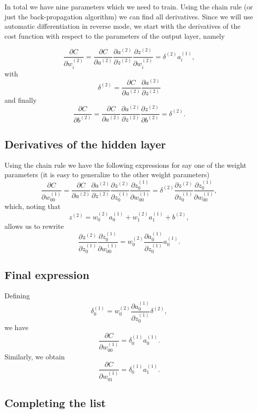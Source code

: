 \documentclass[%
oneside,                 %
final,                   %
10pt]{article}
\begin{document}
In total we have nine parameters which we need to train.  Using the
chain rule (or just the back-propagation algorithm) we can find all
derivatives. Since we will use automatic differentiation in reverse
mode, we start with the derivatives of the cost function with respect
to the parameters of the output layer, namely

\[
\frac{\partial C}{\partial w_{i}^{(2)}}=\frac{\partial C}{\partial a^{(2)}}\frac{\partial a^{(2)}}{\partial z^{(2)}}\frac{\partial z^{(2)}}{\partial w_{i}^{(2)}}=\delta^{(2)}a_i^{(1)},
\]
with
\[
\delta^{(2)}=\frac{\partial C}{\partial a^{(2)}}\frac{\partial a^{(2)}}{\partial z^{(2)}}
\]
and finally
\[
\frac{\partial C}{\partial b^{(2)}}=\frac{\partial C}{\partial a^{(2)}}\frac{\partial a^{(2)}}{\partial z^{(2)}}\frac{\partial z^{(2)}}{\partial b^{(2)}}=\delta^{(2)}.
\]

\subsection{Derivatives of the hidden layer}

Using the chain rule we have the following expressions for say one of the weight parameters (it is easy to generalize to the other weight parameters)
\[
\frac{\partial C}{\partial w_{00}^{(1)}}=\frac{\partial C}{\partial a^{(2)}}\frac{\partial a^{(2)}}{\partial z^{(2)}}
\frac{\partial z^{(2)}}{\partial z_0^{(1)}}\frac{\partial z_0^{(1)}}{\partial w_{00}^{(1)}}=    \delta^{(2)}\frac{\partial z^{(2)}}{\partial z_0^{(1)}}\frac{\partial z_0^{(1)}}{\partial w_{00}^{(1)}},
\]
which, noting that
\[
z^{(2)} =w_0^{(2)}a_0^{(1)}+w_1^{(2)}a_1^{(1)}+b^{(2)},
\]
allows us to rewrite 
\[
\frac{\partial z^{(2)}}{\partial z_0^{(1)}}\frac{\partial z_0^{(1)}}{\partial w_{00}^{(1)}}=w_0^{(2)}\frac{\partial a_0^{(1)}}{\partial z_0^{(1)}}a_0^{(1)}.
\]

\subsection{Final expression}
Defining
\[
\delta_0^{(1)}=w_0^{(2)}\frac{\partial a_0^{(1)}}{\partial z_0^{(1)}}\delta^{(2)},
\]
we have 
\[
\frac{\partial C}{\partial w_{00}^{(1)}}=\delta_0^{(1)}a_0^{(1)}.
\]
Similarly, we obtain
\[
\frac{\partial C}{\partial w_{01}^{(1)}}=\delta_0^{(1)}a_1^{(1)}.
\]

\subsection{Completing the list}
\end{document}
